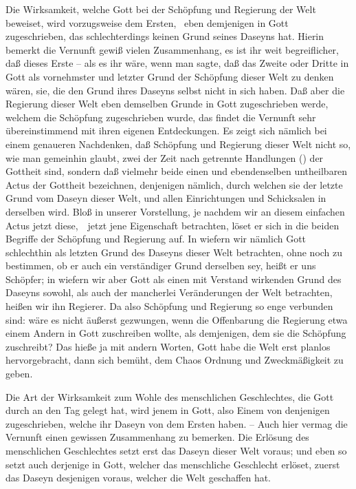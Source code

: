 \begin{aufza}
\begin{aufzb}
\item Die Wirksamkeit, welche Gott bei der Schöpfung und Regierung der Welt beweiset, wird vorzugsweise dem Ersten, \dh\ eben demjenigen in Gott zugeschrieben, das schlechterdings keinen Grund seines Daseyns hat. Hierin bemerkt die Vernunft gewiß vielen Zusammenhang, es ist ihr weit begreiflicher, daß dieses Erste -- als es ihr wäre, wenn man sagte, daß das Zweite oder Dritte in Gott als vornehmster und letzter Grund der Schöpfung dieser Welt zu denken wären, sie, die den Grund ihres Daseyns selbst nicht in sich haben. Daß aber die Regierung dieser Welt eben demselben Grunde in Gott zugeschrieben werde, welchem die Schöpfung zugeschrieben wurde, das findet die Vernunft sehr übereinstimmend mit ihren eigenen Entdeckungen. Es zeigt sich nämlich bei einem genaueren Nachdenken, daß Schöpfung und Regierung dieser Welt nicht so, wie man gemeinhin glaubt, zwei der Zeit nach getrennte Handlungen () der Gottheit sind, sondern daß vielmehr beide einen und ebendenselben untheilbaren Actus der Gottheit bezeichnen, denjenigen nämlich, durch welchen sie der letzte Grund vom Daseyn dieser Welt, und allen Einrichtungen und Schicksalen in derselben wird. Bloß in unserer Vorstellung, je nachdem wir an diesem einfachen Actus jetzt diese,~\ jetzt jene Eigenschaft betrachten, löset er sich in die beiden Begriffe der Schöpfung und Regierung auf. In wiefern wir nämlich Gott schlechthin als letzten Grund des Daseyns dieser Welt betrachten, ohne noch zu bestimmen, ob er auch ein verständiger Grund derselben sey, heißt er uns Schöpfer; in wiefern wir aber Gott als einen mit Verstand wirkenden Grund des Daseyns sowohl, als auch der mancherlei Veränderungen der Welt betrachten, heißen wir ihn Regierer. Da also Schöpfung und Regierung so enge verbunden sind: wäre es nicht äußerst gezwungen, wenn die Offenbarung die Regierung etwa einem Andern in Gott zuschreiben wollte, als demjenigen, dem sie die Schöpfung zuschreibt? Das hieße ja mit andern Worten, Gott habe die Welt erst planlos hervorgebracht, dann sich bemüht, dem Chaos Ordnung und Zweckmäßigkeit zu geben.
\item Die Art der Wirksamkeit zum Wohle des menschlichen Geschlechtes, die Gott durch  an den Tag gelegt hat, wird jenem  in Gott, also Einem von denjenigen zugeschrieben, welche ihr Daseyn von dem Ersten haben. -- Auch hier vermag die Vernunft einen gewissen Zusammenhang zu bemerken. Die Erlösung des menschlichen Geschlechtes setzt erst das Daseyn dieser Welt voraus; und eben so setzt auch derjenige in Gott, welcher das menschliche Geschlecht erlöset, zuerst das Daseyn desjenigen voraus, welcher die Welt geschaffen hat.

\end{aufzb}
\end{aufza}
